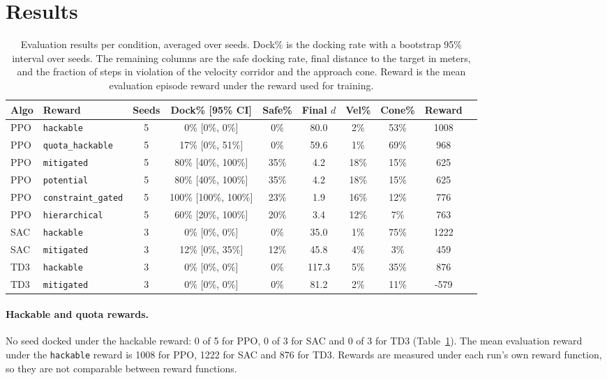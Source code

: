 \documentclass[11pt]{article}
\begin{document}
\section{Results}
\label{sec:results}

\begin{table}[t]
\centering
\small
\caption{Evaluation results per condition, averaged over seeds. Dock\% is the
docking rate with a bootstrap 95\% interval over seeds. The remaining columns are
the safe docking rate, final distance to the target in meters, and the fraction of
steps in violation of the velocity corridor and the approach cone. Reward is the
mean evaluation episode reward under the reward used for training.}
\label{tab:main}
\begin{tabular}{llcccccccr}
\toprule
Algo & Reward & Seeds & Dock\% [95\% CI] & Safe\% & Final $d$ & Vel\% & Cone\% & Reward \\
\midrule
PPO & \texttt{hackable} & 5 & 0\% [0\%, 0\%] & 0\% & 80.0 & 2\% & 53\% & 1008 \\
PPO & \texttt{quota\_hackable} & 5 & 17\% [0\%, 51\%] & 0\% & 59.6 & 1\% & 69\% & 968 \\
PPO & \texttt{mitigated} & 5 & 80\% [40\%, 100\%] & 35\% & 4.2 & 18\% & 15\% & 625 \\
PPO & \texttt{potential} & 5 & 80\% [40\%, 100\%] & 35\% & 4.2 & 18\% & 15\% & 625 \\
PPO & \texttt{constraint\_gated} & 5 & 100\% [100\%, 100\%] & 23\% & 1.9 & 16\% & 12\% & 776 \\
PPO & \texttt{hierarchical} & 5 & 60\% [20\%, 100\%] & 20\% & 3.4 & 12\% & 7\% & 763 \\
SAC & \texttt{hackable} & 3 & 0\% [0\%, 0\%] & 0\% & 35.0 & 1\% & 75\% & 1222 \\
SAC & \texttt{mitigated} & 3 & 12\% [0\%, 35\%] & 12\% & 45.8 & 4\% & 3\% & 459 \\
TD3 & \texttt{hackable} & 3 & 0\% [0\%, 0\%] & 0\% & 117.3 & 5\% & 35\% & 876 \\
TD3 & \texttt{mitigated} & 3 & 0\% [0\%, 0\%] & 0\% & 81.2 & 2\% & 11\% & -579 \\
\bottomrule
\end{tabular}
\end{table}

\paragraph{Hackable and quota rewards.} No seed docked under the hackable
reward: 0 of 5 for PPO, 0 of 3 for SAC and 0 of 3 for TD3
(Table~\ref{tab:main}). The mean evaluation reward under the \texttt{hackable}
reward is 1008 for PPO, 1222 for SAC and 876 for TD3. Rewards are measured under
each run's own reward function, so they are not comparable between reward
functions.
\end{document}
